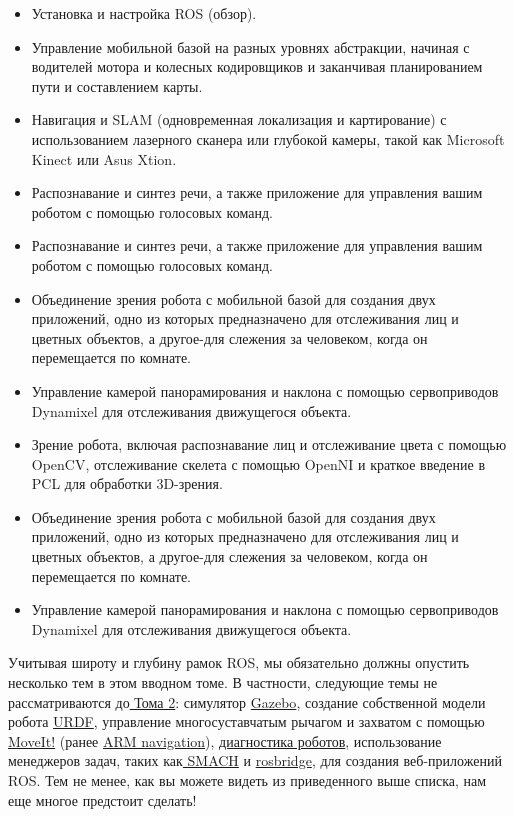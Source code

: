 \begin{itemize} 
\item { Установка и настройка ROS (обзор).} 
\item { Управление мобильной базой на разных уровнях абстракции, начиная с водителей мотора и колесных кодировщиков и заканчивая планированием пути и составлением карты.} 
\item { Навигация и SLAM (одновременная локализация и картирование) с использованием лазерного сканера или глубокой камеры, такой как Microsoft Kinect или Asus Xtion.} 
\item { Распознавание и синтез речи, а также приложение для управления вашим роботом с помощью голосовых команд.} 
\item { Распознавание и синтез речи, а также приложение для управления вашим роботом с помощью голосовых команд.} 
\item { Объединение зрения робота с мобильной базой для создания двух приложений, одно из которых предназначено для отслеживания лиц и цветных объектов, а другое-для слежения за человеком, когда он перемещается по комнате.} 
\item { Управление камерой панорамирования и наклона с помощью сервоприводов Dynamixel для отслеживания движущегося объекта.} 
\item { Зрение робота, включая распознавание лиц и отслеживание цвета с помощью OpenCV, отслеживание скелета с помощью OpenNI и краткое введение в PCL для обработки 3D-зрения.} 
\item { Объединение зрения робота с мобильной базой для создания двух приложений, одно из которых предназначено для отслеживания лиц и цветных объектов, а другое-для слежения за человеком, когда он перемещается по комнате.} 
\item { Управление камерой панорамирования и наклона с помощью сервоприводов Dynamixel для отслеживания движущегося объекта.} 
\end{itemize} 

Учитывая широту и глубину рамок ROS, мы обязательно должны опустить несколько тем в этом вводном томе. В частности, следующие темы не рассматриваются до\href{http://moveit.ros.org/}{ Тома 2}: симулятор \href{http://moveit.ros.org/}{Gazebo}, создание собственной модели робота \href{http://wiki.ros.org/urdf/Tutorials}{URDF}, управление многосуставчатым рычагом и захватом с помощью \href{http://moveit.ros.org/}{MoveIt!} (ранее \href{%20http://wiki.ros.org/arm_navigation}{ARM navigation}), \href{http://wiki.ros.org/diagnostics}{диагностика роботов}, использование менеджеров задач, таких как\href{http://wiki.ros.org/executive_smach}{ SMACH} и \href{http://wiki.ros.org/rosbridge_suite}{rosbridge}, для создания веб-приложений ROS. Тем не менее, как вы можете видеть из приведенного выше списка, нам еще многое предстоит сделать!




